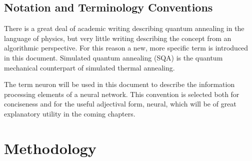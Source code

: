 \documentclass[11pt]{afthesis}
\begin{document}
	
	
	
	
	\section{Notation and Terminology Conventions}
	
	There is a great deal of academic writing describing quantum annealing in the language of physics, but very little writing describing the concept from an algorithmic perspective. For this reason a new, more specific term is introduced in this document. Simulated quantum annealing (SQA) is the quantum mechanical counterpart of simulated thermal annealing. 
	
	
	The term neuron will be used in this document to describe the information processing elements of a neural network. This convention is selected both for conciseness and for the useful adjectival form, neural, which will be of great explanatory utility in the coming chapters.
	
	
	
	
	\chapter{Methodology}
	
\end{document}
